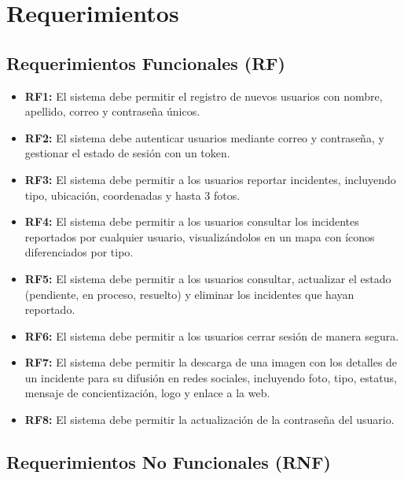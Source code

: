 \section{Requerimientos}

\subsection*{Requerimientos Funcionales (RF)}

\begin{itemize}
    \item \textbf{RF1:} El sistema debe permitir el registro de nuevos usuarios con nombre, apellido, correo y contraseña únicos.
    \item \textbf{RF2:} El sistema debe autenticar usuarios mediante correo y contraseña, y gestionar el estado de sesión con un token.
    \item \textbf{RF3:} El sistema debe permitir a los usuarios reportar incidentes, incluyendo tipo, ubicación, coordenadas y hasta 3 fotos.
    \item \textbf{RF4:} El sistema debe permitir a los usuarios consultar los incidentes reportados por cualquier usuario, visualizándolos en un mapa con íconos diferenciados por tipo.
    \item \textbf{RF5:} El sistema debe permitir a los usuarios consultar, actualizar el estado (pendiente, en proceso, resuelto) y eliminar los incidentes que hayan reportado.
    \item \textbf{RF6:} El sistema debe permitir a los usuarios cerrar sesión de manera segura.
    \item \textbf{RF7:} El sistema debe permitir la descarga de una imagen con los detalles de un incidente para su difusión en redes sociales, incluyendo foto, tipo, estatus, mensaje de concientización, logo y enlace a la web.
    \item \textbf{RF8:} El sistema debe permitir la actualización de la contraseña del usuario.
\end{itemize}

\subsection*{Requerimientos No Funcionales (RNF)}

